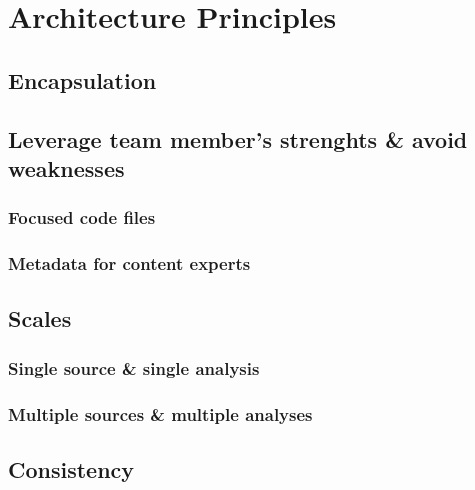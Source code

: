 \documentclass[
]{book}
\begin{document}
\hypertarget{architecture}{%
\chapter{Architecture Principles}\label{architecture}}

\hypertarget{encapsulation}{%
\section{Encapsulation}\label{encapsulation}}

\hypertarget{leverage-team-members-strenghts-avoid-weaknesses}{%
\section{Leverage team member's strenghts \& avoid weaknesses}\label{leverage-team-members-strenghts-avoid-weaknesses}}

\hypertarget{focused-code-files}{%
\subsection{Focused code files}\label{focused-code-files}}

\hypertarget{metadata-for-content-experts}{%
\subsection{Metadata for content experts}\label{metadata-for-content-experts}}

\hypertarget{scales}{%
\section{Scales}\label{scales}}

\hypertarget{single-source-single-analysis}{%
\subsection{Single source \& single analysis}\label{single-source-single-analysis}}

\hypertarget{multiple-sources-multiple-analyses}{%
\subsection{Multiple sources \& multiple analyses}\label{multiple-sources-multiple-analyses}}

\hypertarget{architecture-consistency}{%
\section{Consistency}\label{architecture-consistency}}
\end{document}
